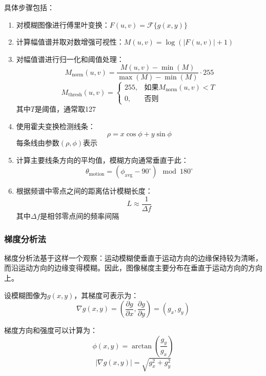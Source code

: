 \documentclass[a4paper,11pt,UTF8]{ctexart}
\begin{document}
具体步骤包括：
\begin{enumerate}
    \item 对模糊图像进行傅里叶变换：$F(u,v) = \mathcal{F}\{g(x,y)\}$
    \item 计算幅值谱并取对数增强可视性：$M(u,v) = \log(|F(u,v)| + 1)$
    \item 对幅值谱进行归一化和阈值处理：
    \begin{equation}
    M_{\text{norm}}(u,v) = \frac{M(u,v) - \min(M)}{\max(M) - \min(M)} \cdot 255
    \end{equation}
    \begin{equation}
    M_{\text{thresh}}(u,v) = 
    \begin{cases}
    255, & \text{如果} M_{\text{norm}}(u,v) < T \\
    0, & \text{否则}
    \end{cases}
    \end{equation}
    其中$T$是阈值，通常取127
    \item 使用霍夫变换检测线条：
    \begin{equation}
    \rho = x\cos\phi + y\sin\phi
    \end{equation}
    每条线由参数$(\rho, \phi)$表示
    \item 计算主要线条方向的平均值，模糊方向通常垂直于此：
    \begin{equation}
    \theta_{\text{motion}} = (\phi_{\text{avg}} - 90^\circ) \mod 180^\circ
    \end{equation}
    \item 根据频谱中零点之间的距离估计模糊长度：
    \begin{equation}
    L \approx \frac{1}{\Delta f}
    \end{equation}
    其中$\Delta f$是相邻零点间的频率间隔
\end{enumerate}

\subsubsection{梯度分析法}
梯度分析法基于这样一个观察：运动模糊使垂直于运动方向的边缘保持较为清晰，而沿运动方向的边缘变得模糊。因此，图像梯度主要分布在垂直于运动方向的方向上。

设模糊图像为$g(x,y)$，其梯度可表示为：
\begin{equation}
\nabla g(x,y) = \left(\frac{\partial g}{\partial x}, \frac{\partial g}{\partial y}\right) = (g_x, g_y)
\end{equation}

梯度方向和强度可以计算为：
\begin{equation}
\phi(x,y) = \arctan\left(\frac{g_y}{g_x}\right)
\end{equation}
\begin{equation}
|\nabla g(x,y)| = \sqrt{g_x^2 + g_y^2}
\end{equation}
\end{document}
